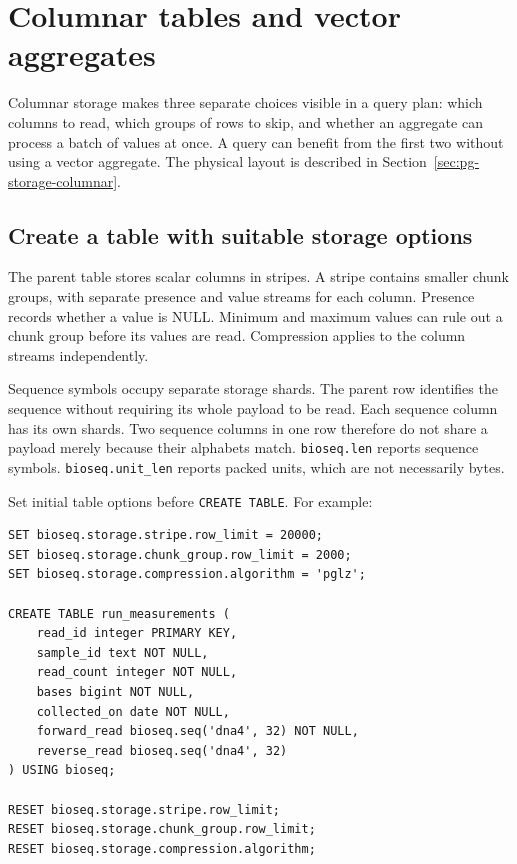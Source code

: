 \section{Columnar tables and vector aggregates}
\label{sec:appendix-columnar}

Columnar storage makes three separate choices visible in a query plan:
which columns to read, which groups of rows to skip, and whether an
aggregate can process a batch of values at once. A query can benefit from
the first two without using a vector aggregate. The physical layout is
described in Section~\ref{sec:pg-storage-columnar}.

\subsection{Create a table with suitable storage options}

The parent table stores scalar columns in stripes. A stripe contains
smaller chunk groups, with separate presence and value streams for each
column. Presence records whether a value is NULL. Minimum and maximum
values can rule out a chunk group before its values are read. Compression
applies to the column streams independently.

Sequence symbols occupy separate storage shards. The parent row identifies
the sequence without requiring its whole payload to be read. Each sequence
column has its own shards. Two sequence columns in one row therefore do
not share a payload merely because their alphabets match.
\texttt{bioseq.len} reports sequence symbols. \texttt{bioseq.unit\_len}
reports packed units, which are not necessarily bytes.

Set initial table options before \texttt{CREATE TABLE}. For example:

\par\noindent\begin{minipage}{\linewidth}
\begin{lstlisting}[style=bioseq-appendix-sql,
  caption={Create a columnar table with two sequence columns.}]
SET bioseq.storage.stripe.row_limit = 20000;
SET bioseq.storage.chunk_group.row_limit = 2000;
SET bioseq.storage.compression.algorithm = 'pglz';

CREATE TABLE run_measurements (
    read_id integer PRIMARY KEY,
    sample_id text NOT NULL,
    read_count integer NOT NULL,
    bases bigint NOT NULL,
    collected_on date NOT NULL,
    forward_read bioseq.seq('dna4', 32) NOT NULL,
    reverse_read bioseq.seq('dna4', 32)
) USING bioseq;

RESET bioseq.storage.stripe.row_limit;
RESET bioseq.storage.chunk_group.row_limit;
RESET bioseq.storage.compression.algorithm;
\end{lstlisting}
\end{minipage}

